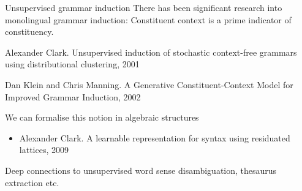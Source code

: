 \documentclass{beamer}
\newenvironment{unpacked_itemize}{
\begin{itemize}
  \setlength{\itemsep}{10pt}
  \setlength{\parskip}{0pt}
  \setlength{\parsep}{0pt}
}{\end{itemize}}
\begin{document}
%

\begin{frame}[t]{Unsupervised grammar induction}
There has been significant research into monolingual grammar induction:
\vspace{0.1in}
\alert{Constituent context is a prime indicator of constituency.}
\begin{unpacked_itemize}
\item Alexander Clark. Unsupervised induction of stochastic context-free grammars using distributional clustering, 2001
\item Dan Klein and Chris Manning. A Generative Constituent-Context Model for Improved Grammar Induction, 2002
\end{unpacked_itemize}
\vspace{0.1in}
\alert{We can formalise this notion in algebraic structures}
\begin{itemize}
\item Alexander Clark. A learnable representation for syntax using residuated lattices, 2009
\end{itemize}
\vspace{0.1in}
Deep connections to unsupervised word sense disambiguation, thesaurus extraction etc.
\end{frame}
\end{document}
